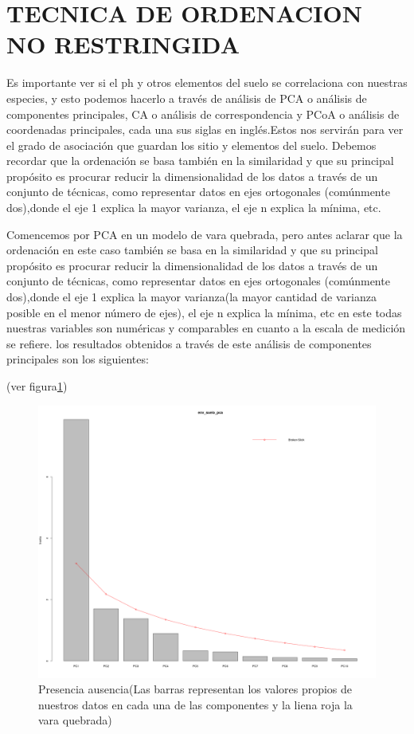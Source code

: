 \documentclass[11pt,]{article}
\begin{document}
\section{TECNICA DE ORDENACION NO
RESTRINGIDA}\label{tecnica-de-ordenacion-no-restringida}

Es importante ver si el ph y otros elementos del suelo se correlaciona
con nuestras especies, y esto podemos hacerlo a través de análisis de
PCA o análisis de componentes principales, CA o análisis de
correspondencia y PCoA o análisis de coordenadas principales, cada una
sus siglas en inglés.Estos nos servirán para ver el grado de asociación
que guardan los sitio y elementos del suelo. Debemos recordar que la
ordenación se basa también en la similaridad y que su principal
propósito es procurar reducir la dimensionalidad de los datos a través
de un conjunto de técnicas, como representar datos en ejes ortogonales
(comúnmente dos),donde el eje 1 explica la mayor varianza, el eje n
explica la mínima, etc.

Comencemos por PCA en un modelo de vara quebrada, pero antes aclarar que
la ordenación en este caso también se basa en la similaridad y que su
principal propósito es procurar reducir la dimensionalidad de los datos
a través de un conjunto de técnicas, como representar datos en ejes
ortogonales (comúnmente dos),donde el eje 1 explica la mayor varianza(la
mayor cantidad de varianza posible en el menor número de ejes), el eje n
explica la mínima, etc en este todas nuestras variables son numéricas y
comparables en cuanto a la escala de medición se refiere. los resultados
obtenidos a través de este análisis de componentes principales son los
siguientes:

(ver figura\ref{fig:PCA_1})

\begin{figure}
\centering
\includegraphics{PCA_1.png}
\caption{\label{fig:PCA_1}Presencia ausencia(Las barras representan los
valores propios de nuestros datos en cada una de las componentes y la
liena roja la vara quebrada)}
\end{figure}
\end{document}
